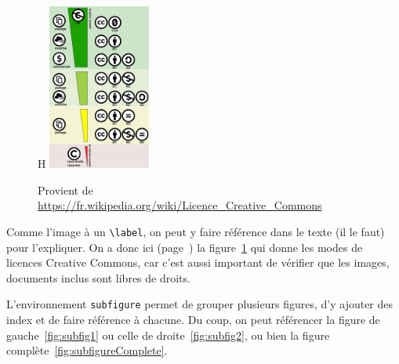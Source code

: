 \documentclass{rapportAlgoM1}
\begin{document}
\begin{figure}H
	\centering
	\includegraphics[width=0.3\textwidth]{images/creative_commons_license_spectrum_fr.png} %
	\caption{Provient de \url{https://fr.wikipedia.org/wiki/Licence_Creative_Commons}}
	\label{fig:ccbysa}
\end{figure}

Comme l'image à un \verb+\label+, on peut y faire référence dans le texte (il le faut) pour l'expliquer. On a donc ici (page~\pageref{fig:ccbysa}) la figure~\ref{fig:ccbysa} qui donne les modes de licences Creative Commons, car c'est aussi important de vérifier que les images, documents inclus sont libres de droits.

L'environnement \verb+subfigure+ permet de grouper plusieurs figures, d'y ajouter des index et de faire référence à chacune. Du coup, on peut référencer la figure de gauche~\ref{fig:subfig1} ou celle de droite~\ref{fig:subfig2}, ou bien la figure complète~\ref{fig:subfigureComplete}.
\end{document}
